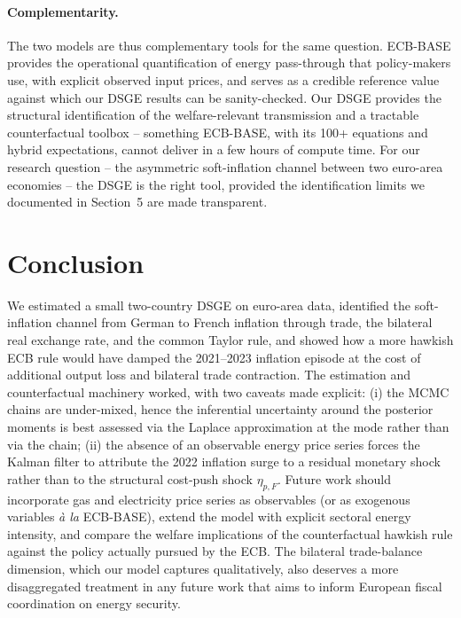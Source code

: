 \documentclass[11pt,a4paper]{article}
\begin{document}
\paragraph{Complementarity.}
The two models are thus complementary tools for the same question.
ECB-BASE provides the operational quantification of energy
pass-through that policy-makers use, with explicit observed input
prices, and serves as a credible reference value against which our
DSGE results can be sanity-checked. Our DSGE provides the structural
identification of the welfare-relevant transmission and a tractable
counterfactual toolbox -- something ECB-BASE, with its 100+ equations
and hybrid expectations, cannot deliver in a few hours of compute
time. For our research question -- the asymmetric soft-inflation
channel between two euro-area economies -- the DSGE is the right
tool, provided the identification limits we documented in Section~5
are made transparent.

\section{Conclusion}
We estimated a small two-country DSGE on euro-area data, identified
the soft-inflation channel from German to French inflation through
trade, the bilateral real exchange rate, and the common Taylor rule,
and showed how a more hawkish ECB rule would have damped the
2021--2023 inflation episode at the cost of additional output loss
and bilateral trade contraction. The estimation and counterfactual
machinery worked, with two caveats made explicit: (i) the MCMC
chains are under-mixed, hence the inferential uncertainty around the
posterior moments is best assessed via the Laplace approximation
at the mode rather than via the chain; (ii) the absence of an
observable energy price series forces the Kalman filter to attribute
the 2022 inflation surge to a residual monetary shock rather than to
the structural cost-push shock $\eta_{p,F}$. Future work should
incorporate gas and electricity price series as observables (or as
exogenous variables \emph{à la} ECB-BASE), extend the model with
explicit sectoral energy intensity, and compare the welfare
implications of the counterfactual hawkish rule against the policy
actually pursued by the ECB. The bilateral trade-balance dimension,
which our model captures qualitatively, also deserves a more
disaggregated treatment in any future work that aims to inform
European fiscal coordination on energy security.
\end{document}
